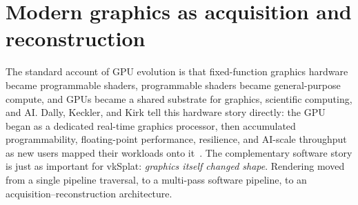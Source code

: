 \documentclass[10pt,journal]{IEEEtran}
\begin{document}
\section{Modern graphics as acquisition and reconstruction}
\label{sec:acqrec}

The standard account of GPU evolution is that fixed-function graphics
hardware became programmable shaders, programmable shaders became
general-purpose compute, and GPUs became a shared substrate for
graphics, scientific computing, and AI. Dally, Keckler, and Kirk tell
this hardware story directly: the GPU began as a dedicated real-time
graphics processor, then accumulated programmability, floating-point
performance, resilience, and AI-scale throughput as new users mapped
their workloads onto it~\cite{dally2021gpu}. The complementary software
story is just as important for vkSplat: \emph{graphics itself changed
shape}. Rendering moved from a single pipeline traversal, to a
multi-pass software pipeline, to an acquisition--reconstruction
architecture.
\end{document}
